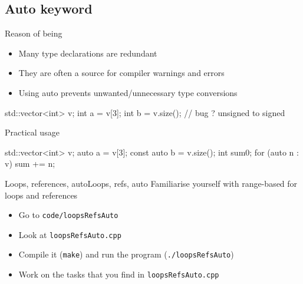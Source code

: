 \subsection[auto]{Auto keyword}

\begin{frame}[fragile]
  \begin{block}{Reason of being}
    \begin{itemize}
    \item Many type declarations are redundant
    \item They are often a source for compiler warnings and errors
    \item Using auto prevents unwanted/unnecessary type conversions
    \end{itemize}
    \begin{cppcode*}{}
      std::vector<int> v;
      int a = v[3];
      int b = v.size();  // bug ? unsigned to signed
    \end{cppcode*}
  \end{block}
  \pause
  \begin{block}{Practical usage}
    \begin{cppcode*}{}
      std::vector<int> v;
      auto a = v[3];
      const auto b = v.size();
      int sum{0};
      for (auto n : v) { sum += n; }
    \end{cppcode*}
  \end{block}
\end{frame}

\begin{frame}[fragile]
  \begin{exerciseWithShortcut}{Loops, references, auto}{Loops, refs, auto}
    Familiarise yourself with range-based for loops and references
    \begin{itemize}
      \item Go to \texttt{code/loopsRefsAuto}
      \item Look at \texttt{loopsRefsAuto.cpp}
      \item Compile it (\texttt{make}) and run the program (\texttt{./loopsRefsAuto})
      \item Work on the tasks that you find in \texttt{loopsRefsAuto.cpp}
    \end{itemize}
  \end{exerciseWithShortcut}
\end{frame}
